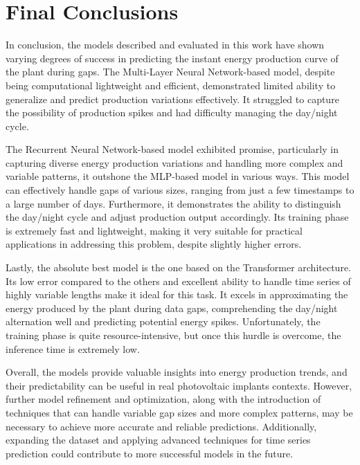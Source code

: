 \section{Final Conclusions}
In conclusion, the models described and evaluated in this work have shown varying degrees of success in predicting the instant energy production curve of the plant during gaps. The Multi-Layer Neural Network-based model, despite being computational lightweight and efficient, demonstrated limited ability to generalize and predict production variations effectively. It struggled to capture the possibility of production spikes and had difficulty managing the day/night cycle.

The Recurrent Neural Network-based model exhibited promise, particularly in capturing diverse energy production variations and handling more complex and variable patterns, it outshone the MLP-based model in various ways. This model can effectively handle gaps of various sizes, ranging from just a few timestamps to a large number of days. Furthermore, it demonstrates the ability to distinguish the day/night cycle and adjust production output accordingly. Its training phase is extremely fast and lightweight, making it very suitable for practical applications in addressing this problem, despite slightly higher errors.

Lastly, the absolute best model is the one based on the Transformer architecture. Its low error compared to the others and excellent ability to handle time series of highly variable lengths make it ideal for this task. It excels in approximating the energy produced by the plant during data gaps, comprehending the day/night alternation well and predicting potential energy spikes. Unfortunately, the training phase is quite resource-intensive, but once this hurdle is overcome, the inference time is extremely low.

Overall, the models provide valuable insights into energy production trends, and their predictability can be useful in real photovoltaic implants contexts. However, further model refinement and optimization, along with the introduction of techniques that can handle variable gap sizes and more complex patterns, may be necessary to achieve more accurate and reliable predictions. Additionally, expanding the dataset and applying advanced techniques for time series prediction could contribute to more successful models in the future.